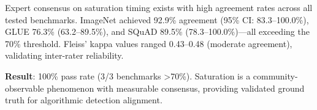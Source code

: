 
Expert consensus on saturation timing exists with high agreement rates across all tested benchmarks. ImageNet achieved 92.9\% agreement (95\% CI: 83.3--100.0\%), GLUE 76.3\% (63.2--89.5\%), and SQuAD 89.5\% (78.3--100.0\%)---all exceeding the 70\% threshold. Fleiss' kappa values ranged 0.43--0.48 (moderate agreement), validating inter-rater reliability.

\begin{table}[htbp]
\centering
{}
\end{table}

\textbf{Result}: 100\% pass rate (3/3 benchmarks >70\%). Saturation is a community-observable phenomenon with measurable consensus, providing validated ground truth for algorithmic detection alignment.

